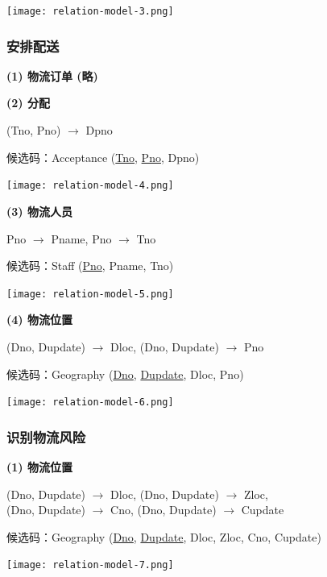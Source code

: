 \documentclass[12pt]{article}
\begin{document}
\begin{center}
	\texttt{[image: relation-model-3.png]}
\end{center}

\subsubsection{安排配送}

\noindent \textbf{(1) 物流订单 (略)} \par 

\noindent \textbf{(2) 分配} \par 
(Tno, Pno) $\rightarrow$ Dpno \par
候选码：Acceptance (\underline{Tno}, \underline{Pno}, Dpno)

\begin{center}
	\texttt{[image: relation-model-4.png]}
\end{center}

\noindent \textbf{(3) 物流人员} \par 
Pno $\rightarrow$ Pname, Pno $\rightarrow$ Tno \par
候选码：Staff (\underline{Pno}, Pname, Tno)

\begin{center}
	\texttt{[image: relation-model-5.png]}
\end{center}

\noindent \textbf{(4) 物流位置} \par 
(Dno, Dupdate) $\rightarrow$ Dloc, (Dno, Dupdate) $\rightarrow$ Pno \par
候选码：Geography (\underline{Dno}, \underline{Dupdate}, Dloc, Pno)

\begin{center}
	\texttt{[image: relation-model-6.png]}
\end{center}

\subsubsection{识别物流风险}

\noindent \textbf{(1) 物流位置} \par 
(Dno, Dupdate) $\rightarrow$ Dloc, (Dno, Dupdate) $\rightarrow$ Zloc,\\ 
(Dno, Dupdate) $\rightarrow$ Cno, (Dno, Dupdate) $\rightarrow$ Cupdate \par
候选码：Geography (\underline{Dno}, \underline{Dupdate}, Dloc, Zloc, Cno, Cupdate)

\begin{center}
	\texttt{[image: relation-model-7.png]}
\end{center}
\end{document}
